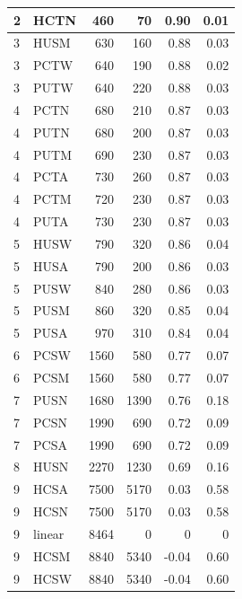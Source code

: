 \documentclass{svjour3}
\theoremstyle{break}
\begin{document}
\begin{table}
\begin{center}
{{\begin{tabular}{l@{~~~}l@{~~~}r@{~~~}r@{~~~}r@{~~~}r}
  2 &         HCTN &    460  &  70 & 0.90 & 0.01 \\
\hline  3 &         HUSM &    630  &  160 & 0.88 & 0.03 \\
\rowcolor{red!30}
  3 &         PCTW &    640  &  190 & 0.88 & 0.02 \\
  3 &         PUTW &    640  &  220 & 0.88 & 0.03 \\
\hline  4 &         PCTN &    680  &  210 & 0.87 & 0.03 \\
  4 &         PUTN &    680  &  200 & 0.87 & 0.03 \\
  4 &         PUTM &    690  &  230 & 0.87 & 0.03 \\
  4 &         PCTA &    730  &  260 & 0.87 & 0.03 \\
  4 &         PCTM &    720  &  230 & 0.87 & 0.03 \\
  4 &         PUTA &    730  &  230 & 0.87 & 0.03 \\
\hline  5 &         HUSW &    790  &  320 & 0.86 & 0.04 \\
  5 &         HUSA &    790  &  200 & 0.86 & 0.03 \\
  5 &         PUSW &    840  &  280 & 0.86 & 0.03 \\
  5 &         PUSM &    860  &  320 & 0.85 & 0.04 \\
  \rowcolor{red!30}
  5 &         PUSA &    970  &  310 & 0.84 & 0.04 \\
\hline  6 &         PCSW &    1560  &  580 & 0.77 & 0.07 \\
  6 &         PCSM &    1560  &  580 & 0.77 & 0.07 \\
\hline  7 &         PUSN &    1680  &  1390 & 0.76 & 0.18 \\
  7 &         PCSN &    1990  &  690 & 0.72 & 0.09 \\
  7 &         PCSA &    1990  &  690 & 0.72 & 0.09 \\
\hline  8 &         HUSN &    2270  &  1230 & 0.69 & 0.16 \\
\hline  9 &         HCSA &    7500  &  5170 & 0.03 & 0.58 \\
  9 &         HCSN &    7500  &  5170 & 0.03 & 0.58 \\
   \rowcolor{blue!50}
  9 &       linear &    8464  &  0 & 0 & 0 \\
  9 &         HCSM &    8840  &  5340 & -0.04 & 0.60 \\
  9 &         HCSW &    8840  &  5340 & -0.04 & 0.60 \\
\hline \end{tabular}}
}



\end{center}
\end{table}
\end{document}
